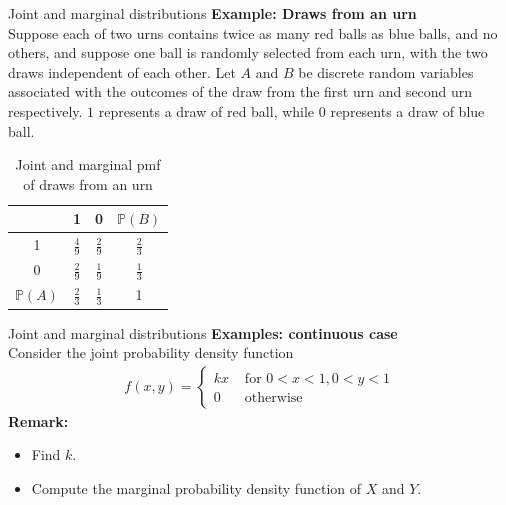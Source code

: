 \documentclass [aspectratio=169]{beamer}
\begin{document}
\begin{frame}{Joint and marginal distributions}
\textbf{Example: Draws from an urn}\\
Suppose each of two urns contains twice as many red balls as blue balls, and no others, and suppose one ball is randomly selected from each urn, with the two draws independent of each other. Let $A$ and $B$ be discrete random variables associated with the outcomes of the draw from the first urn and second urn respectively. $1$ represents a draw of red ball, while $0$ represents a draw of blue ball.
\renewcommand{\arraystretch}{1.5}
\begin{table}[]
    \centering
    \begin{tabular}{|c|c c |c|}
    \hline
      & 1  &  0 & $\mathbb{P}(B)$ \\
      \hline
       1  & $\frac{4}{9}$ & $\frac{2}{9}$ & $\frac{2}{3}$\\
       \hline
       0 & $\frac{2}{9}$ & $\frac{1}{9}$ & $\frac{1}{3}$\\
       \hline
       $\mathbb{P}(A)$ & $\frac{2}{3}$ &  $\frac{1}{3}$ & 1\\
       \hline
    \end{tabular}
    \caption{Joint and marginal pmf of draws from an urn}
    \label{tab:my_label}
\end{table}

\end{frame}

\begin{frame}{Joint and marginal distributions}
\textbf{Examples: continuous case}\\
Consider the joint probability density function
\begin{equation*}
    \begin{aligned}
    f(x, y)= \begin{cases}k x & \text { for } 0<x<1,0<y<1 \\ 0 & \text { otherwise }\end{cases}
    \end{aligned}
\end{equation*}
\vspace{0.1in}
\textbf{Remark:}\\
\begin{itemize}
    \item Find $k$.
    \item Compute the marginal probability density function of $X$ and $Y$.
\end{itemize}
\end{frame}
\end{document}
